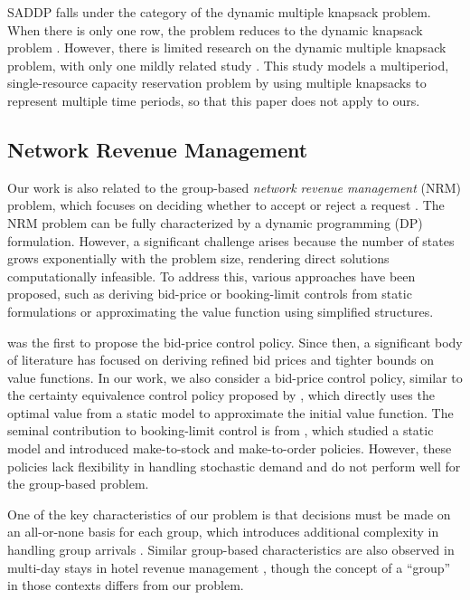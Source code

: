 SADDP falls under the category of the dynamic multiple knapsack problem. When there is only one row, the problem reduces to the dynamic knapsack problem \parencite{kleywegt1998dynamic}. However, there is limited research on the dynamic multiple knapsack problem, with only one mildly related study \parencite{perry2009approximate}. This study models a multiperiod, single-resource capacity reservation problem by using multiple knapsacks to represent multiple time periods, so that this paper does not apply to ours.


\subsection{Network Revenue Management}
Our work is also related to the group-based \textit{network revenue management} (NRM) problem, which focuses on deciding whether to accept or reject a request \parencite{gallego1997multiproduct}. The NRM problem can be fully characterized by a dynamic programming (DP) formulation. However, a significant challenge arises because the number of states grows exponentially with the problem size, rendering direct solutions computationally infeasible. To address this, various approaches have been proposed, such as deriving bid-price or booking-limit controls from static formulations or approximating the value function using simplified structures.

\textcite{talluri1998analysis} was the first to propose the bid-price control policy. Since then, a significant body of literature has focused on deriving refined bid prices and tighter bounds on value functions. In our work, we also consider a bid-price control policy, similar to the certainty equivalence control policy proposed by \textcite{bertsimas2003revenue}, which directly uses the optimal value from a static model to approximate the initial value function. The seminal contribution to booking-limit control is from \textcite{gallego1997multiproduct}, which studied a static model and introduced make-to-stock and make-to-order policies. However, these policies lack flexibility in handling stochastic demand and do not perform well for the group-based problem.


One of the key characteristics of our problem is that decisions must be made on an all-or-none basis for each group, which introduces additional complexity in handling group arrivals \parencite{talluri2006theory}. Similar group-based characteristics are also observed in multi-day stays in hotel revenue management \parencite{aydin2018decomposition, bitran1995application}, though the concept of a ``group'' in those contexts differs from our problem.


